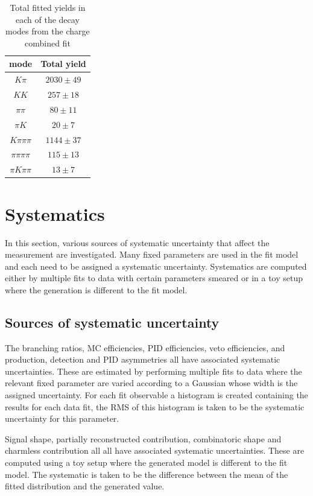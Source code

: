 \begin{table}
\centering
\begin{tabular}{c|c}
\hline
\D mode & Total yield \\
\hline
$K\pi$ & $2030 \pm 49$ \\
$KK$ & $257 \pm 18$ \\
$\pi\pi$ & $80 \pm 11$ \\
$\pi K$ & $20 \pm 7$ \\
$K\pi\pi\pi$ & $1144 \pm 37$ \\
$\pi\pi\pi\pi$ & $115 \pm 13$ \\
$\pi K\pi\pi$ & $13 \pm 7$ \\
\hline
\end{tabular}
\caption{Total fitted yields in each of the \D decay modes from the charge combined fit}
\label{fittedyields}
\end{table}



\clearpage

\section{Systematics}
\label{sec:systematics}

In this section, various sources of systematic uncertainty that affect the measurement are investigated. Many fixed parameters are used in the fit model and each need to be assigned a systematic uncertainty. Systematics are computed either by multiple fits to data with certain parameters smeared or in a toy setup where the generation is different to the fit model. 

\subsection{Sources of systematic uncertainty}

The branching ratios, MC efficiencies, PID efficiencies, veto efficiencies, and production, detection and PID asymmetries all have associated systematic uncertainties. These are estimated by performing multiple fits to data where the relevant fixed parameter are varied according to a Gaussian whose width is the assigned uncertainty. For each fit observable a histogram is created containing the results for each data fit, the RMS of this histogram is taken to be the systematic uncertainty for this parameter.

Signal shape, partially reconstructed contribution, combinatoric shape and charmless contribution all all have associated systematic uncertainties. These are computed using a toy setup where the generated model is different to the fit model. The systematic is taken to be the difference between the mean of the fitted distribution and the generated value.

